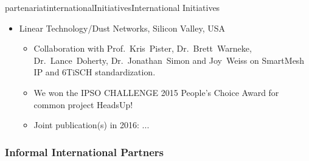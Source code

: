 \documentclass{ra2016}
\begin{document}
\begin{module}{partenariat}{internationalInitiatives}{International Initiatives}
\begin{itemize}
\begin{itemize}
        \end{itemize}
    \item Linear Technology/Dust Networks, Silicon Valley, USA
        \begin{itemize}
            \item Collaboration with Prof.~Kris~Pister, Dr.~Brett~Warneke, Dr.~Lance~Doherty, Dr.~Jonathan~Simon and Joy~Weiss on SmartMesh IP and 6TiSCH standardization.
            \item We won the IPSO CHALLENGE 2015 People's Choice Award for common project HeadsUp!
            \item Joint publication(s) in 2016: ...
        \end{itemize}
\end{itemize}

%

\subsubsection{Informal International Partners}


\end{module}
\end{document}
